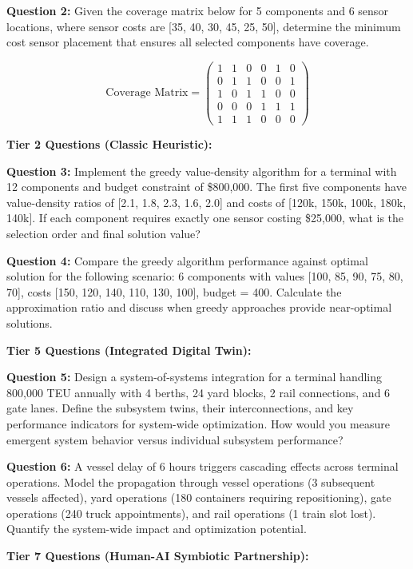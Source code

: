 \documentclass{article}
\begin{document}
\textbf{Question 2:} Given the coverage matrix below for 5 components and 6 sensor locations, where sensor costs are [35, 40, 30, 45, 25, 50], determine the minimum cost sensor placement that ensures all selected components have coverage.

\[
\text{Coverage Matrix} = \begin{pmatrix}
1 & 1 & 0 & 0 & 1 & 0 \\
0 & 1 & 1 & 0 & 0 & 1 \\
1 & 0 & 1 & 1 & 0 & 0 \\
0 & 0 & 0 & 1 & 1 & 1 \\
1 & 1 & 1 & 0 & 0 & 0
\end{pmatrix}
\]

\textbf{Tier 2 Questions (Classic Heuristic):}

\textbf{Question 3:} Implement the greedy value-density algorithm for a terminal with 12 components and budget constraint of \$800,000. The first five components have value-density ratios of [2.1, 1.8, 2.3, 1.6, 2.0] and costs of [120k, 150k, 100k, 180k, 140k]. If each component requires exactly one sensor costing \$25,000, what is the selection order and final solution value?

\textbf{Question 4:} Compare the greedy algorithm performance against optimal solution for the following scenario: 6 components with values [100, 85, 90, 75, 80, 70], costs [150, 120, 140, 110, 130, 100], budget = 400. Calculate the approximation ratio and discuss when greedy approaches provide near-optimal solutions.

\textbf{Tier 5 Questions (Integrated Digital Twin):}

\textbf{Question 5:} Design a system-of-systems integration for a terminal handling 800,000 TEU annually with 4 berths, 24 yard blocks, 2 rail connections, and 6 gate lanes. Define the subsystem twins, their interconnections, and key performance indicators for system-wide optimization. How would you measure emergent system behavior versus individual subsystem performance?

\textbf{Question 6:} A vessel delay of 6 hours triggers cascading effects across terminal operations. Model the propagation through vessel operations (3 subsequent vessels affected), yard operations (180 containers requiring repositioning), gate operations (240 truck appointments), and rail operations (1 train slot lost). Quantify the system-wide impact and optimization potential.

\textbf{Tier 7 Questions (Human-AI Symbiotic Partnership):}
\end{document}
